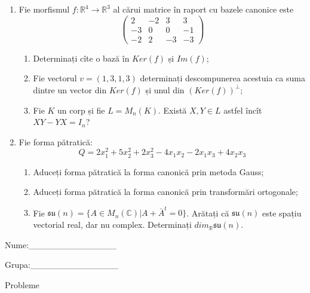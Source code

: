 \documentclass{article}
\begin{document}
\begin{enumerate}
 \item Fie morfismul $f:\mathbb{R}^4 \to \mathbb{R}^3$ al cărui matrice în raport cu bazele canonice este
$$\begin{pmatrix}
2&-2&3&3\\
-3&0&0&-1\\
-2&2&-3&-3
\end{pmatrix}$$

\begin{enumerate}
\item Determinați cîte o bază în $Ker(f)$ și $Im(f)$;
\item Fie vectorul $v=(1,3,1,3)$ determinați descompunerea acestuia ca suma dintre un vector din $Ker(f)$ și unul din $(Ker(f))^\perp$;
\item Fie $K$ un corp și fie $L=M_n(K)$. Există $X,Y \in L$ astfel încît $XY-YX=I_n$?  
\end{enumerate}
\item Fie forma pătratică:
$$Q= 2x_1^2+5x_2^2+2x_3^2-4x_1x_2-2x_1x_3+4x_2x_3$$

\begin{enumerate}
\item Aduceți forma pătratică la forma canonică prin metoda Gauss;
\item Aduceți forma pătratică la forma canonică prin transformări ortogonale;
\item Fie $\mathfrak{su}(n)=\{ A \in M_n(\mathbb{C}) | A+\bar{A}^t=0\}$. Arătați că $\mathfrak{su}(n)$ este spațiu vectorial real, dar nu complex.
Determinați $dim_{\mathbb{R}}\mathfrak{su}(n)$.
\end{enumerate}
\end{enumerate}
\newpage
\begin{flushright}
Nume:\_\_\_\_\_\_\_\_\_\_\_\_\_\_
 
 
Grupa:\_\_\_\_\_\_\_\_\_\_\_\_\_\_
\end{flushright}
\begin{center}
\vspace{2cm}
{\Large Probleme}
\vspace{2cm}
\end{center}
\end{document}
